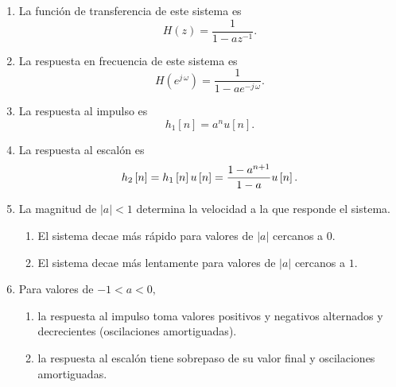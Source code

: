 \begin{enumerate}
\item  La funci\'{o}n de transferencia de este sistema es
\begin{equation}
H\left( z\right) =\frac{1}{1-az^{-1}}.
\end{equation}

\item  La respuesta en frecuencia de este sistema es
\begin{equation}
H\left( e^{j \, \omega }\right) =\frac{1}{1-ae^{-j \, \omega }}.
\end{equation}

\item  La respuesta al impulso es
\begin{equation}
h_{1}\left[ n\right] =a^{n}u\left[ n\right] .
\end{equation}

\item  La respuesta al escal\'{o}n es
\begin{equation}
h_{2}\left[ n\right] =h_{1}\left[ n\right]  u\left[ n\right] =\frac{%
1-a^{n+1}}{1-a}u\left[ n\right] .
\end{equation}

\item  La magnitud de $\left| a\right| <1$ determina la velocidad a la que
responde el sistema. 

\begin{enumerate}
\item  El sistema decae m\'{a}s r\'{a}pido para valores de $\left| a\right| $ cercanos a $0.$

\item  El sistema decae m\'{a}s lentamente para valores de $\left| a\right| $ cercanos a $1.$
\end{enumerate}

\item  Para valores de $-1<a<0,$ 

\begin{enumerate}
\item  la respuesta al impulso toma valores positivos y negativos alternados y decrecientes 
(oscilaciones amortiguadas). 

\item  la respuesta al escal\'{o}n tiene sobrepaso de su valor final y oscilaciones amortiguadas. 
\end{enumerate}


\end{enumerate}

